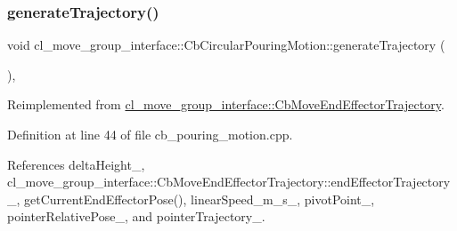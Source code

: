 \subsubsection{\texorpdfstring{generate\+Trajectory()}{generateTrajectory()}}
{\footnotesize\ttfamily void cl\+\_\+move\+\_\+group\+\_\+interface\+::\+Cb\+Circular\+Pouring\+Motion\+::generate\+Trajectory (\begin{DoxyParamCaption}{ }\end{DoxyParamCaption})\hspace{0.3cm}{\ttfamily [override]}, {\ttfamily [virtual]}}



Reimplemented from \hyperlink{classcl__move__group__interface_1_1CbMoveEndEffectorTrajectory_aeae938ab66e18ab7d2fb2427bc83647b}{cl\+\_\+move\+\_\+group\+\_\+interface\+::\+Cb\+Move\+End\+Effector\+Trajectory}.



Definition at line 44 of file cb\+\_\+pouring\+\_\+motion.\+cpp.



References delta\+Height\+\_\+, cl\+\_\+move\+\_\+group\+\_\+interface\+::\+Cb\+Move\+End\+Effector\+Trajectory\+::end\+Effector\+Trajectory\+\_\+, get\+Current\+End\+Effector\+Pose(), linear\+Speed\+\_\+m\+\_\+s\+\_\+, pivot\+Point\+\_\+, pointer\+Relative\+Pose\+\_\+, and pointer\+Trajectory\+\_\+.


